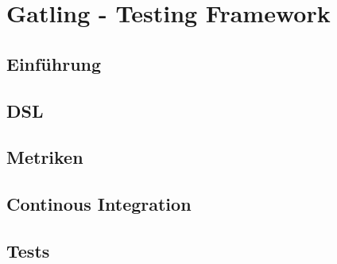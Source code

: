 \chapter{Gatling - Testing Framework}


\section{Einführung}

\section{DSL}

\section{Metriken}

\section{Continous Integration}


\section{Tests}